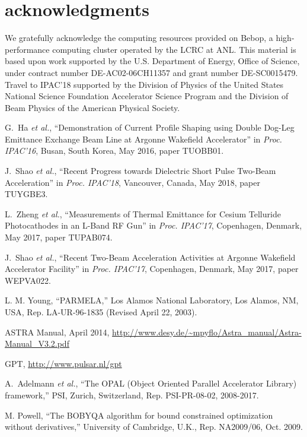 \documentclass[letterpaper,  %
              ]{jacow-2_3}   %
\begin{document}
\section{acknowledgments}
We gratefully acknowledge the computing resources
provided on Bebop, a high-performance computing cluster
operated by the LCRC at ANL.
This material is based upon work supported by the 
U.S. Department of Energy, Office of Science, under 
contract number DE-AC02-06CH11357 and grant number DE-SC0015479. 
Travel to IPAC'18 supported by the Division of Physics 
of the United States National Science Foundation 
Accelerator Science Program and the Division of 
Beam Physics of the American Physical Society.

\begin{thebibliography}{99}
G.~Ha \emph{et al.}, “Demonstration of Current Profile 
Shaping using Double Dog-Leg Emittance Exchange Beam 
Line at Argonne Wakefield Accelerator”
in \textit{Proc. IPAC’16}, 
Busan, South Korea, May 2016, 
paper TUOBB01.

J.~Shao \emph{et al.}, “Recent Progress towards Dielectric Short Pulse Two-Beam Acceleration”
in \textit{Proc. IPAC’18}, 
Vancouver, Canada, May 2018, 
paper TUYGBE3.

L.~Zheng \emph{et al.}, “Measurements of Thermal Emittance 
for Cesium Telluride Photocathodes in an L-Band RF Gun”
in \textit{Proc. IPAC’17}, 
Copenhagen, Denmark, May 2017, 
paper TUPAB074.

J.~Shao \emph{et al.}, “Recent Two-Beam 
Acceleration Activities at Argonne Wakefield Accelerator Facility”
in \textit{Proc. IPAC’17}, 
Copenhagen, Denmark, May 2017, 
paper WEPVA022.

L. M. Young, “PARMELA,”
Los Alamos National Laboratory, 
Los Alamos, NM, USA,
Rep. LA-UR-96-1835 (Revised April 22, 2003).

ASTRA Manual, April 2014, 
\url{http://www.desy.de/~mpyflo/Astra_manual/Astra-Manual_V3.2.pdf}

GPT,  \url{http://www.pulsar.nl/gpt}

A.~Adelmann \emph{et al.},
“The OPAL (Object Oriented Parallel Accelerator Library) framework,”
PSI, Zurich, Switzerland,
Rep. PSI-PR-08-02, 2008-2017.

M. Powell, “The BOBYQA algorithm for bound constrained
optimization without derivatives,” University of Cambridge,
U.K., Rep. NA2009/06, Oct. 2009.


\end{thebibliography}
\end{document}
